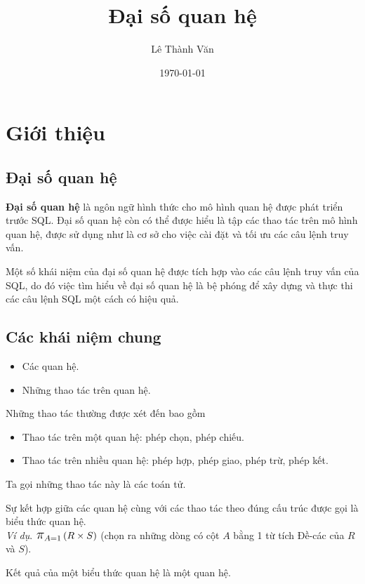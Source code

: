 \documentclass[11pt]{beamer}
\title{Đại số quan hệ}
\institute{Khoa Hệ thống thông tin quản lý}
\author{Lê Thành Văn}
\date{\today}
\newcommand{\mmm}[1]{\mathlarger{\mathlarger{\mathlarger#1}}}%
\newcommand{\ppi}[2]{\mmm{\pi}_{#1}\left(#2\right)}%
\begin{document}
  \begin{frame}
    \titlepage
  \end{frame}
  \section{Giới thiệu}
  \subsection{Đại số quan hệ}
  \begin{frame}
    \textbf{Đại số quan hệ} là ngôn ngữ hình thức cho mô hình quan hệ được phát triển trước SQL. 
    Đại số quan hệ còn có thể được hiểu là tập các thao tác trên mô hình quan hệ, được sử dụng như là cơ sở cho việc cài đặt và tối ưu các câu lệnh truy vấn.
  \end{frame}
  \begin{frame}
    Một số khái niệm của đại số quan hệ được tích hợp vào các câu lệnh truy vấn của SQL, 
    do đó việc tìm hiểu về đại số quan hệ là bệ phóng để xây dựng và thực thi các câu lệnh SQL một cách có hiệu quả.
  \end{frame}
  \subsection{Các khái niệm chung}
  \begin{frame}
    \begin{itemize}
      \item<2-> Các quan hệ.
      \item<3-> Những thao tác trên quan hệ.
    \end{itemize}  
  \end{frame}
  \begin{frame}
    Những thao tác thường được xét đến bao gồm
    \begin{itemize}
      \item Thao tác trên một quan hệ: phép chọn, phép chiếu.
      \item Thao tác trên nhiều quan hệ: phép hợp, phép giao, phép trừ, phép kết.
    \end{itemize}
    Ta gọi những thao tác này là các toán tử.
  \end{frame}
  \begin{frame}
    Sự kết hợp giữa các quan hệ cùng với các thao tác theo đúng cấu trúc được gọi là biểu thức quan hệ. \\
    \textit{Ví dụ}. $\ppi{A = 1}{R \times S}$ (chọn ra những dòng có cột $A$ bằng 1 từ 
    tích Đề-các của $R$ và $S$).
  \end{frame}
  \begin{frame}
    Kết quả của một biểu thức quan hệ là một quan hệ.
  \end{frame}
\end{document}
